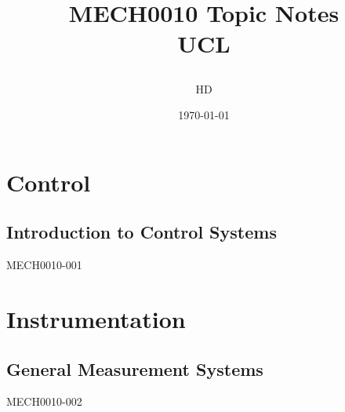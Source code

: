 \documentclass[12pt,a4paper, twoside]{report}
\begin{document}
\title{
  {MECH0010 Topic Notes}\\
  {\large UCL}
  \author{HD}
  \date{\today}
}
\maketitle
\tableofcontents
\part{Control}
\chapter{Introduction to Control Systems}
{MECH0010-001}
\part{Instrumentation}
\chapter{General Measurement Systems}
{MECH0010-002}
\end{document}

